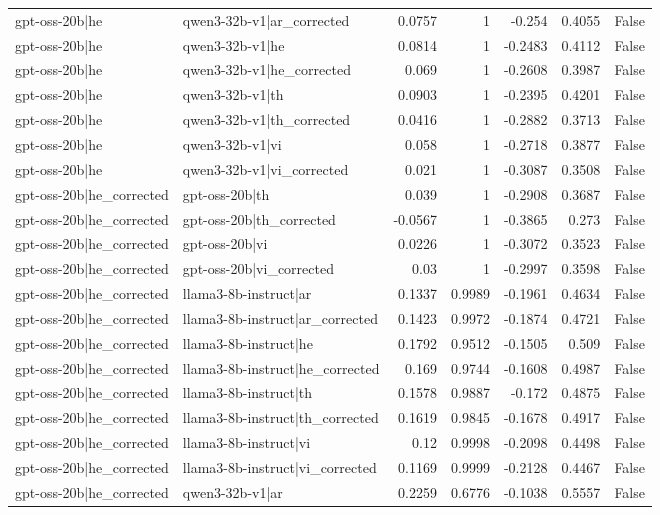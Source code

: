 \begin{table}
\begin{tabular}{l l r r r r l}
gpt-oss-20b|he & qwen3-32b-v1|ar_corrected & 0.0757 & 1 & -0.254 & 0.4055 & False \\
gpt-oss-20b|he & qwen3-32b-v1|he & 0.0814 & 1 & -0.2483 & 0.4112 & False \\
gpt-oss-20b|he & qwen3-32b-v1|he_corrected & 0.069 & 1 & -0.2608 & 0.3987 & False \\
gpt-oss-20b|he & qwen3-32b-v1|th & 0.0903 & 1 & -0.2395 & 0.4201 & False \\
gpt-oss-20b|he & qwen3-32b-v1|th_corrected & 0.0416 & 1 & -0.2882 & 0.3713 & False \\
gpt-oss-20b|he & qwen3-32b-v1|vi & 0.058 & 1 & -0.2718 & 0.3877 & False \\
gpt-oss-20b|he & qwen3-32b-v1|vi_corrected & 0.021 & 1 & -0.3087 & 0.3508 & False \\
gpt-oss-20b|he_corrected & gpt-oss-20b|th & 0.039 & 1 & -0.2908 & 0.3687 & False \\
gpt-oss-20b|he_corrected & gpt-oss-20b|th_corrected & -0.0567 & 1 & -0.3865 & 0.273 & False \\
gpt-oss-20b|he_corrected & gpt-oss-20b|vi & 0.0226 & 1 & -0.3072 & 0.3523 & False \\
gpt-oss-20b|he_corrected & gpt-oss-20b|vi_corrected & 0.03 & 1 & -0.2997 & 0.3598 & False \\
gpt-oss-20b|he_corrected & llama3-8b-instruct|ar & 0.1337 & 0.9989 & -0.1961 & 0.4634 & False \\
gpt-oss-20b|he_corrected & llama3-8b-instruct|ar_corrected & 0.1423 & 0.9972 & -0.1874 & 0.4721 & False \\
gpt-oss-20b|he_corrected & llama3-8b-instruct|he & 0.1792 & 0.9512 & -0.1505 & 0.509 & False \\
gpt-oss-20b|he_corrected & llama3-8b-instruct|he_corrected & 0.169 & 0.9744 & -0.1608 & 0.4987 & False \\
gpt-oss-20b|he_corrected & llama3-8b-instruct|th & 0.1578 & 0.9887 & -0.172 & 0.4875 & False \\
gpt-oss-20b|he_corrected & llama3-8b-instruct|th_corrected & 0.1619 & 0.9845 & -0.1678 & 0.4917 & False \\
gpt-oss-20b|he_corrected & llama3-8b-instruct|vi & 0.12 & 0.9998 & -0.2098 & 0.4498 & False \\
gpt-oss-20b|he_corrected & llama3-8b-instruct|vi_corrected & 0.1169 & 0.9999 & -0.2128 & 0.4467 & False \\
gpt-oss-20b|he_corrected & qwen3-32b-v1|ar & 0.2259 & 0.6776 & -0.1038 & 0.5557 & False \\

\end{tabular}
\end{table}
